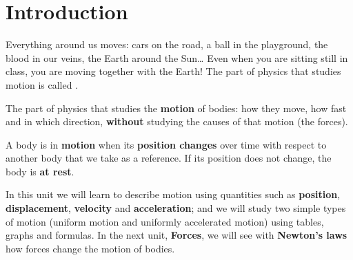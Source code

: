%
%
%

\raggedbottom %

\section{Introduction}

Everything around us moves: cars on the road, a ball in the playground, the blood in our veins, the Earth around the Sun\ldots{} Even when you are sitting still in class, you are moving together with the Earth! The part of physics that studies motion is called .

\begin{definition}[Kinematics]
    The part of physics that studies the \textbf{motion} of bodies: how they move, how fast and in which direction, \textbf{without} studying the causes of that motion (the forces).
\end{definition}

\begin{definition}[Motion]
    A body is in \textbf{motion} when its \textbf{position changes} over time with respect to another body that we take as a reference. If its position does not change, the body is \textbf{at rest}.
\end{definition}

In this unit we will learn to describe motion using quantities such as \textbf{position}, \textbf{displacement}, \textbf{velocity} and \textbf{acceleration}; and we will study two simple types of motion (uniform motion and uniformly accelerated motion) using tables, graphs and formulas. In the next unit, \textbf{Forces}, we will see with \textbf{Newton's laws} how forces change the motion of bodies.

